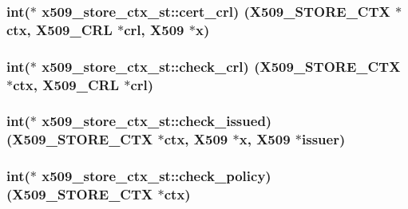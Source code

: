 \subsubsection[{\texorpdfstring{cert\+\_\+crl}{cert_crl}}]{\setlength{\rightskip}{0pt plus 5cm}int($\ast$ x509\+\_\+store\+\_\+ctx\+\_\+st\+::cert\+\_\+crl) ({\bf X509\+\_\+\+S\+T\+O\+R\+E\+\_\+\+C\+TX} $\ast${\bf ctx}, {\bf X509\+\_\+\+C\+RL} $\ast$crl, {\bf X509} $\ast$x)}\hypertarget{structx509__store__ctx__st_a76329537e9627b1c18140ae28649aeb2}{}\label{structx509__store__ctx__st_a76329537e9627b1c18140ae28649aeb2}
\subsubsection[{\texorpdfstring{check\+\_\+crl}{check_crl}}]{\setlength{\rightskip}{0pt plus 5cm}int($\ast$ x509\+\_\+store\+\_\+ctx\+\_\+st\+::check\+\_\+crl) ({\bf X509\+\_\+\+S\+T\+O\+R\+E\+\_\+\+C\+TX} $\ast${\bf ctx}, {\bf X509\+\_\+\+C\+RL} $\ast$crl)}\hypertarget{structx509__store__ctx__st_a6a39a62fb969f4dc15e782de8a895a2f}{}\label{structx509__store__ctx__st_a6a39a62fb969f4dc15e782de8a895a2f}
\subsubsection[{\texorpdfstring{check\+\_\+issued}{check_issued}}]{\setlength{\rightskip}{0pt plus 5cm}int($\ast$ x509\+\_\+store\+\_\+ctx\+\_\+st\+::check\+\_\+issued) ({\bf X509\+\_\+\+S\+T\+O\+R\+E\+\_\+\+C\+TX} $\ast${\bf ctx}, {\bf X509} $\ast$x, {\bf X509} $\ast$issuer)}\hypertarget{structx509__store__ctx__st_af1c8a974d279ded984821b37c2cd2b4c}{}\label{structx509__store__ctx__st_af1c8a974d279ded984821b37c2cd2b4c}
\subsubsection[{\texorpdfstring{check\+\_\+policy}{check_policy}}]{\setlength{\rightskip}{0pt plus 5cm}int($\ast$ x509\+\_\+store\+\_\+ctx\+\_\+st\+::check\+\_\+policy) ({\bf X509\+\_\+\+S\+T\+O\+R\+E\+\_\+\+C\+TX} $\ast${\bf ctx})}\hypertarget{structx509__store__ctx__st_a3e0bffe45fdc52dc8505a640433da741}{}\label{structx509__store__ctx__st_a3e0bffe45fdc52dc8505a640433da741}
